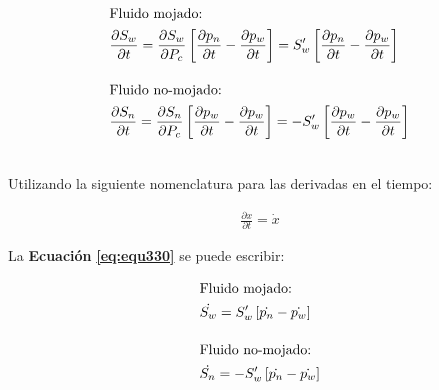 \begin{ceqn} 
\begin{subequations} \label{eq:equ330} 
\begin{align}
\shortintertext{Fluido mojado:}     &\frac{\partial S_w}{\partial t} = \frac{\partial S_w}{\partial P_c}\left[\frac{\partial p_n}{\partial t}-\frac{\partial p_w}{\partial t}\right] = S'_w\left[\frac{\partial p_n}{\partial t}-\frac{\partial p_w}{\partial t}\right] \label{eq:equ330a} \\[10pt]
\shortintertext{Fluido no-mojado:} 	&\frac{\partial S_n}{\partial t} = \frac{\partial S_n}{\partial P_c}\left[\frac{\partial p_w}{\partial t}-\frac{\partial p_w}{\partial t}\right] = -S'_w\left[\frac{\partial p_w}{\partial t}-\frac{\partial p_w}{\partial t}\right] \label{eq:equ330b}
\end{align}
\end{subequations} 
\end{ceqn}
\\
Utilizando la siguiente nomenclatura para las derivadas en el tiempo:

\begin{ceqn} 
\begin{gather} \label{eq:equ331} 
\frac{\partial x}{\partial t} = \dot{x}
\end{gather}  
\end{ceqn}

La \textbf{Ecuación} \textbf{\ref{eq:equ330}} se puede escribir:

\begin{ceqn} 
\begin{subequations} \label{eq:equ332} 
\begin{align}
\shortintertext{Fluido mojado:}     &\dot{S_w} = S'_w\left[\dot{p_n}-\dot{ p_w}\right] \label{eq:equ332a} \\[10pt]
\shortintertext{Fluido no-mojado:} 	&\dot{S_n} = -S'_w\left[\dot{p_n}-\dot{ p_w}\right] \label{eq:equ332b}
\end{align}
\end{subequations} 
\end{ceqn}


